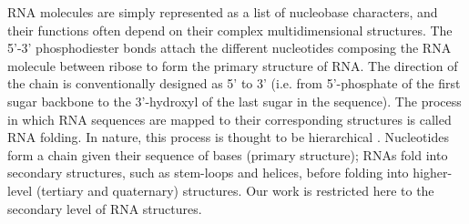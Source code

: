 RNA molecules are simply represented as a list of nucleobase characters, and their functions often depend on their complex multidimensional structures. The 5'-3' phosphodiester bonds attach the different nucleotides composing the RNA molecule between ribose to form the primary structure of RNA. The direction of the chain is conventionally designed as 5' to 3' (i.e. from 5'-phosphate of the first sugar backbone to the 3'-hydroxyl of the last sugar in the sequence). The process in which RNA sequences are mapped to their corresponding structures is called RNA folding. In nature, this process is thought to be hierarchical \cite{brion1997hierarchy,tinoco1999rna}. Nucleotides form a chain given their sequence of bases (primary structure); RNAs fold into secondary structures, such as stem-loops and helices, before folding into higher-level (tertiary and quaternary) structures. Our work is restricted here to the secondary level of RNA structures.

